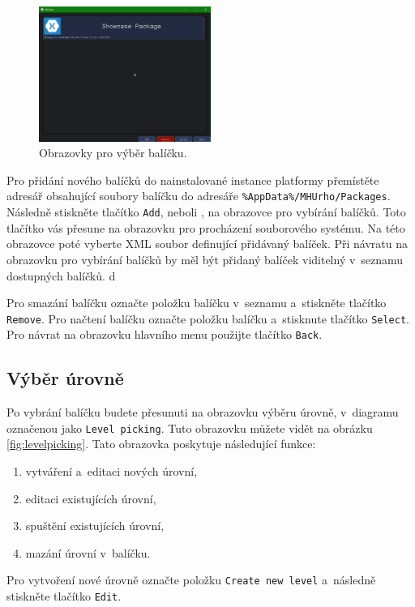 \begin{figure}[h]
	\centering
	\includegraphics[width=0.5\textwidth]{img/PackagePickingScreen.png}
	\caption{Obrazovky pro výběr balíčku.}
	\label{fig:packagepicking}
\end{figure}

Pro přidání nového balíčků do nainstalované instance platformy přemístěte adresář obsahující soubory balíčku do adresáře \texttt{\%AppData\%/MHUrho/Packages}. Následně stiskněte tlačítko \texttt{Add}, neboli , na obrazovce pro vybírání balíčků. Toto tlačítko vás přesune na obrazovku pro procházení souborového systému. Na této obrazovce poté vyberte XML soubor definující přidávaný balíček. Při návratu na obrazovku pro vybírání balíčků by měl být přidaný balíček viditelný v~seznamu dostupných balíčků. d

Pro smazání balíčku označte položku balíčku v~seznamu a~stiskněte tlačítko \texttt{Remove}. Pro načtení balíčku  označte položku balíčku a~stisknute tlačítko \texttt{Select}. Pro návrat na obrazovku hlavního menu použijte tlačítko \texttt{Back}.

\subsection{Výběr úrovně}
Po vybrání balíčku budete přesunuti na obrazovku výběru úrovně, v~diagramu označenou jako \texttt{Level picking}. Tuto obrazovku můžete vidět na obrázku \ref{fig:levelpicking}. Tato obrazovka poskytuje následující funkce:

\begin{enumerate}
	\item vytváření a~editaci nových úrovní,
	\item editaci existujících úrovní,
	\item spuštění existujících úrovní,
	\item mazání úrovní v~balíčku.
\end{enumerate}

Pro vytvoření nové úrovně označte položku \texttt{Create new level} a~následně stiskněte tlačítko \texttt{Edit}.

